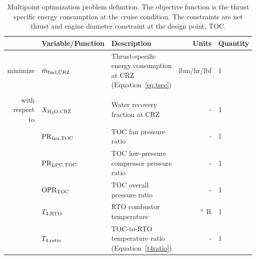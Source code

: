 \documentclass[conf]{new-aiaa}
\begin{document}
\begin{table}[hbt!]
    \centering
    \caption{
        Multipoint optimization problem definition.
        The objective function is the thrust specific energy consumption at the cruise condition.
        The constraints are net thrust and engine diameter constraint at the design point, TOC.
    }
    \small
    \renewcommand{\arraystretch}{1.2}
    \begin{tabular}{r l l r l}
        \toprule
                        & Variable/Function              & Description                                                              & Units           & Quantity \\
        \hline
        minimize        & $\dot{m}_{\rm{fuel,CRZ}} $     & Thrust-specific energy consumption at CRZ (Equation~\eqref{eq:tsec})     & \si{lbm/hr/lbf} & 1        \\
                        &                                &                                                                          &                 &          \\
        with respect to & $X_{\rm{H_2O,CRZ}}$            & Water recovery fraction at CRZ                                           & -               & 1        \\
                        & $\rm{PR}_{\rm{fan,TOC}}$       & TOC fan pressure ratio                                                   & -               & 1        \\
                        & $\rm{PR}_{\rm{LPC,TOC}}$       & TOC low-pressure compressor pressure ratio                               & -               & 1        \\
                        & $\rm{OPR}_{\rm{TOC}}$          & TOC overall pressure ratio                                               & -               & 1        \\
                        & $T_{4,\rm{RTO}}$               & RTO combustor temperature                                                & \si{\degree R}  & 1        \\
                        & $T_{4,\rm{ratio}}$             & TOC-to-RTO temperature ratio (Equation~\eqref{t4ratio})                  & -               & 1        \\

\end{tabular}
\end{table}
\end{document}
